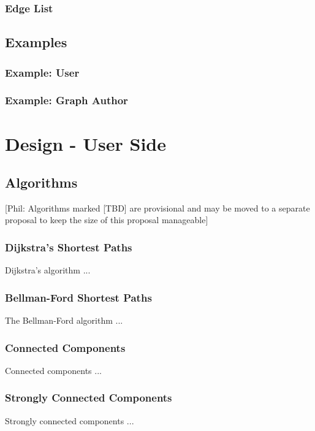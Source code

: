 \documentclass[10pt,onecolumn]{article}
\newcommand{\comment}[2]{{\color{comment}[{\sc #1:} \textsf{#2}]}}
\newcommand{\phil}[1]{\comment{Phil}{#1}}
\begin{document}
\subsubsection{Edge List}

\subsection{Examples}
\subsubsection{Example: User}
\subsubsection{Example: Graph Author}

\section{Design - User Side}
\subsection{Algorithms}
\phil{Algorithms marked [TBD] are provisional and may be moved to a separate proposal to keep the size of this proposal manageable}

\subsubsection{Dijkstra's Shortest Paths}
Dijkstra's algorithm \cite{REF_} ...

\subsubsection{Bellman-Ford Shortest Paths}
The Bellman-Ford algorithm \cite{REF_} ...

\subsubsection{Connected Components}
Connected components \cite{REF_} ...

\subsubsection{Strongly Connected Components}
Strongly connected components \cite{REF_} ...
\end{document}
